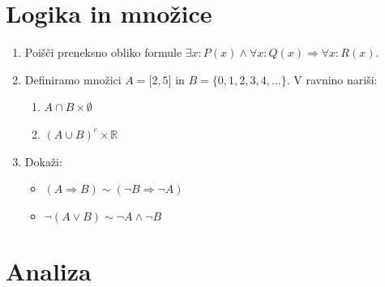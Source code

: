 \documentclass[a4paper,12pt]{article}
\begin{document}

\section*{Logika in množice}

\begin{enumerate}
\item
Poišči preneksno obliko formule \(\exists x: P(x) \land \forall x: Q(x) \Rightarrow \forall x : R(x) \).

\item
Definiramo množici \( A=\lbrack2,5\rbrack\) in \(B=\lbrace0,1,2,3,4,\dots\rbrace\).
V ravnino nariši:
\begin{enumerate}
\item \(A\cap B\times\emptyset\)
\item \((A\cup B)^c\times \mathbb{R} \)
\end{enumerate}

\item
Dokaži:
\begin{itemize}
\item \((A\Rightarrow B)\sim(\neg B \Rightarrow \neg A)\)
\item \(\neg(A \vee B)\sim \neg A \land \neg B\)
\end{itemize}
\end{enumerate}

\section*{Analiza}
\end{document}
